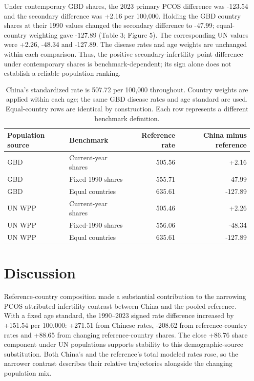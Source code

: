 \documentclass[11pt,a4paper]{article}
\begin{document}
Under contemporary GBD shares, the 2023 primary PCOS difference was -123.54 and the secondary difference was +2.16 per 100,000. Holding the GBD country shares at their 1990 values changed the secondary difference to -47.99; equal-country weighting gave -127.89 (Table 3; Figure 5). The corresponding UN values were +2.26, -48.34 and -127.89. The disease rates and age weights are unchanged within each comparison. Thus, the positive secondary-infertility point difference under contemporary shares is benchmark-dependent; its sign alone does not establish a reliable population ranking.

\begin{table}[htbp]\centering\small{}
\caption{Benchmark definition changes the 2023 PCOS secondary infertility contrast.}\label{tab:bench}
\begin{tabular}{llrr}\toprule
Population source & Benchmark & Reference rate & China minus reference\\\midrule
GBD & Current-year shares & 505.56 & +2.16\\
GBD & Fixed-1990 shares & 555.71 & -47.99\\
GBD & Equal countries & 635.61 & -127.89\\
UN WPP & Current-year shares & 505.46 & +2.26\\
UN WPP & Fixed-1990 shares & 556.06 & -48.34\\
UN WPP & Equal countries & 635.61 & -127.89\\
\bottomrule
\end{tabular}
\caption*{China's standardized rate is 507.72 per 100,000 throughout. Country weights are applied within each age; the same GBD disease rates and age standard are used. Equal-country rows are identical by construction. Each row represents a different benchmark definition.}
\end{table}

\section{Discussion}
Reference-country composition made a substantial contribution to the narrowing PCOS-attributed infertility contrast between China and the pooled reference. With a fixed age standard, the 1990--2023 signed rate difference increased by +151.54 per 100,000: +271.51 from Chinese rates, -208.62 from reference-country rates and +88.65 from changing reference-country shares. The close +86.76 share component under UN populations supports stability to this demographic-source substitution. Both China's and the reference's total modeled rates rose, so the narrower contrast describes their relative trajectories alongside the changing population mix.
\end{document}
